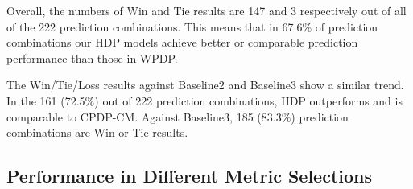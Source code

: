 


Overall, the numbers of Win and
Tie results are 147 and 3 respectively out of all of the 222 prediction
combinations.
This means that in 67.6\% of prediction combinations our HDP
models achieve better or comparable prediction performance than those in
WPDP.

The Win/Tie/Loss results against Baseline2 and Baseline3 show a similar trend.
In the 161 (72.5\%) out of 222 prediction combinations, HDP outperforms and is comparable to CPDP-CM. Against Baseline3, 185
(83.3\%) prediction combinations are Win or Tie results.


\subsection{Performance in Different Metric Selections}
\label{subsec04}

